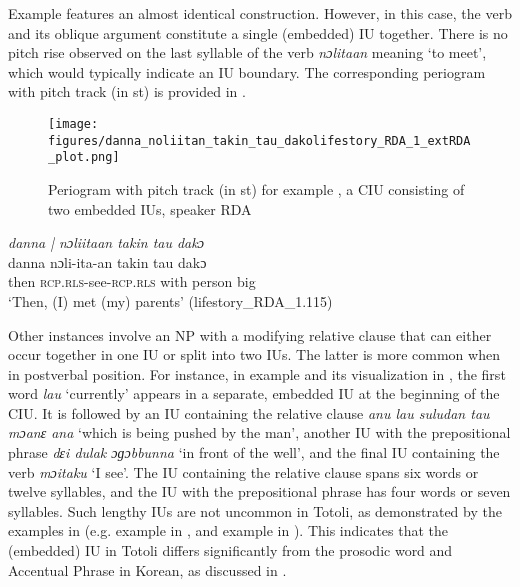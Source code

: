 Example  features an almost identical construction. However, in this case, the verb and its oblique argument constitute a single (embedded) IU together. There is no pitch rise observed on the last syllable of the verb \textit{nɔlitaan} meaning ‘to meet’, which would typically indicate an IU boundary. The corresponding periogram with pitch track (in st) is provided in  .

\begin{figure}
	\texttt{[image: figures/danna\_noliitan\_takin\_tau\_dakolifestory\_RDA\_1\_extRDA\_plot.png]}
	\caption{Periogram with pitch track (in st) for example , a CIU consisting of two embedded IUs, speaker RDA}
	\label{pitch:danna noliitaan takin tau dako}
\end{figure}



\ea
\label{ex:danna noliitaan takin tau dako}
\textit{danna | nɔliitaan takin tau dakɔ} \\
\gll danna nɔli-ita-an takin tau dakɔ	 \\
then \textsc{rcp.rls}-see-\textsc{rcp.rls} with person big\\
\glt ‘Then, (I)  met  (my) parents’ \hfill(lifestory\_RDA\_1.115)
\z



Other instances involve an NP with a modifying relative clause that can either occur together in one IU or split into two IUs. The latter is more common when in postverbal position. For instance, in example  and its visualization in   , the first word \textit{lau} `currently' appears in a separate, embedded IU at the beginning of the CIU. It is followed by an IU containing the relative clause \textit{anu lau suludan tau mɔanɛ ana } `which is being pushed by the man', another IU with the prepositional phrase \textit{dɛi dulak ɔɡɔbbunna} `in front of the well', and the final IU containing the verb \textit{mɔitaku} `I see'. The IU containing the relative clause spans six words or twelve syllables, and the IU with the prepositional phrase has four words or seven syllables. Such lengthy IUs are not uncommon in Totoli, as demonstrated by the examples in   (e.g. example  in  , and example   in  ). This indicates that the (embedded) IU in Totoli differs significantly from the prosodic word and Accentual Phrase  in Korean,  as discussed in   .

